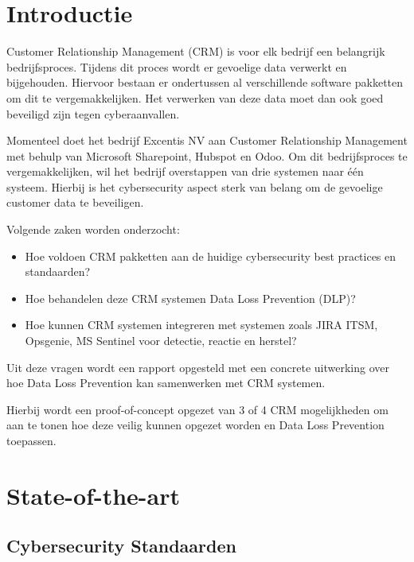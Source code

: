 
\section{Introductie}%
\label{sec:introductie}

Customer Relationship Management (CRM) is voor elk bedrijf een belangrijk bedrijfsproces. Tijdens dit proces wordt er gevoelige data verwerkt en bijgehouden. Hiervoor bestaan er ondertussen al verschillende software pakketten om dit te vergemakkelijken. Het verwerken van deze data moet dan ook goed beveiligd zijn tegen cyberaanvallen.

Momenteel doet het bedrijf Excentis NV aan Customer Relationship Management met behulp van Microsoft Sharepoint, Hubspot en Odoo. Om dit bedrijfsproces te vergemakkelijken, wil het bedrijf overstappen van drie systemen naar één systeem. Hierbij is het cybersecurity aspect sterk van belang om de gevoelige customer data te beveiligen.

\newline
Volgende zaken worden onderzocht:
\begin{itemize}
    \item Hoe voldoen CRM pakketten aan de huidige cybersecurity best practices en standaarden?
    \item Hoe behandelen deze CRM systemen Data Loss Prevention (DLP)?
    \item Hoe kunnen CRM systemen integreren met systemen zoals JIRA ITSM, Opsgenie, MS Sentinel voor detectie, reactie en herstel?
\end{itemize}
  
Uit deze vragen wordt een rapport opgesteld met een concrete uitwerking over hoe Data Loss Prevention kan samenwerken met CRM systemen.

Hierbij wordt een proof-of-concept opgezet van 3 of 4 CRM mogelijkheden om aan te tonen hoe deze veilig kunnen opgezet worden en Data Loss Prevention toepassen.



\section{State-of-the-art}%
\label{sec:state-of-the-art}
\subsection{Cybersecurity Standaarden}

